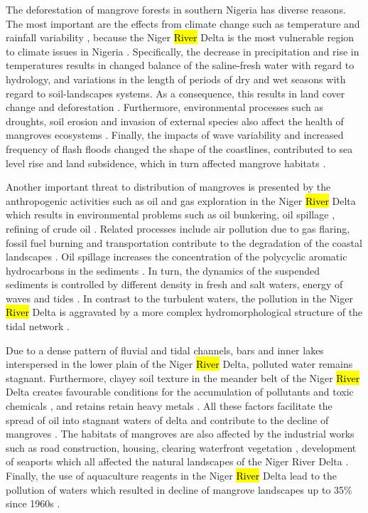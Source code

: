 \documentclass[jmse,article,submit,pdftex,moreauthors]{Definitions/mdpi}
\begin{document}
The deforestation of mangrove forests in southern Nigeria has diverse reasons. The most important are the effects from climate change such as temperature and rainfall variability \cite{Adefolalu,AREOLA2018153,w12020385}, because the Niger \hl{River} Delta is the most vulnerable region to climate issues in Nigeria \cite{BALOGUN2022100304,hydrology7010019}. Specifically, the decrease in precipitation and rise in temperatures results in changed balance of the saline-fresh water with regard to hydrology, and variations in the length of periods of dry and wet seasons with regard to soil-landscapes systems. As a consequence, this results in land cover change and deforestation \cite{Akintuyi,KHADIJAT2021983}. Furthermore, environmental processes such as droughts, soil erosion and invasion of external species also affect the health of mangroves ecosystems \cite{UKPONG199761}. Finally, the impacts of wave variability and increased frequency of flash floods changed the shape of the coastlines, contributed to sea level rise and land subsidence, which in turn affected mangrove habitats \cite{DARAMOLA2022102167,OSINOWO2021104471}. 

Another important threat to distribution of mangroves is presented by the anthropogenic activities such as oil and gas exploration in the Niger \hl{River} Delta \cite{su142114256} which results in environmental problems such as oil bunkering, oil spillage \cite{OBIDA2021145854}, refining of crude oil \cite{EYANKWARE2020100293}. Related processes include air pollution due to gas flaring, fossil fuel burning and transportation contribute to the degradation of the coastal landscapes \cite{socsci11110525}. Oil spillage increases the concentration of the polycyclic aromatic hydrocarbons in the sediments \cite{Sojinu}. In turn, the dynamics of the suspended sediments is controlled by different density in fresh and salt waters, energy of waves and tides \cite{Munasinghe}.  In contrast to the turbulent waters, the pollution in the Niger \hl{River} Delta is aggravated by a more complex hydromorphological structure of the tidal network \cite{GEORGE2019103592}. 

Due to a dense pattern of fluvial and tidal channels, bars and inner lakes interspersed in the lower plain of the Niger \hl{River} Delta, polluted water remains stagnant. Furthermore, clayey soil texture in the meander belt of the Niger \hl{River} Delta \cite{Kamalu} creates favourable conditions for the accumulation of pollutants and toxic chemicals \cite{w13223295,toxics11010006,UKHUREBOR2021112872}, and retains retain heavy metals \cite{Amusan,OKOYE2022100222,OKOYE2021111273}. All these factors facilitate the spread of oil into stagnant waters of delta and contribute to the decline of mangroves \cite{ONYIA2020377,ODISU2021111993,ZABBEY2014167}. The habitats of mangroves are also affected by the industrial works such as road construction, housing, clearing waterfront vegetation \cite{Zabbey}, development of seaports which all affected the natural landscapes of the Niger River Delta \cite{OMIUNU198957}. Finally, the use of aquaculture reagents in the Niger \hl{River} Delta lead to the pollution of waters which resulted in decline of mangrove landscapes up to 35\% since 1960s \cite{Godstime}. 
\end{document}
